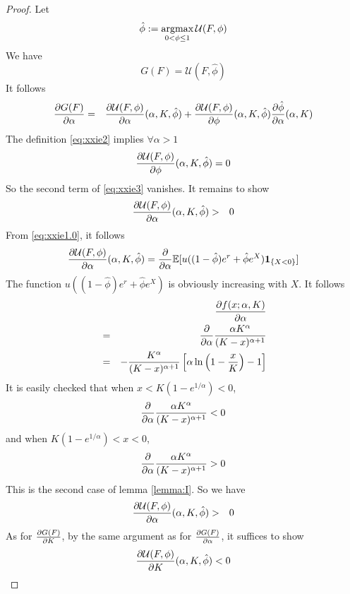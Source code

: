 \documentclass{article}
\begin{document}
\begin{proof}
  Let
  \begin{equation}
    \label{eq:xxie2}
    \hat \phi := \operatorname*{argmax}_{0 < \phi \leq 1} \mathcal U(F, \phi)
  \end{equation}
  We have
  \[
  G(F) = \mathcal U(F, \hat\phi)
  \]
  It follows
  \begin{eqnarray}
    \frac{\partial G(F)}{\partial \alpha}
    &=&
    \frac{\partial \mathcal U(F, \phi)}{\partial \alpha}(\alpha, K, \hat\phi)
    + \frac{\partial \mathcal U(F, \phi)}{\partial \phi}(\alpha, K, \hat\phi)
    \frac{\partial \hat\phi}{\partial \alpha}(\alpha, K)
    \label{eq:xxie3}
  \end{eqnarray}
  The definition \eqref{eq:xxie2} implies $\forall \alpha > 1$
  \begin{equation}
    \label{eq:xxie4}
    \frac{\partial \mathcal U(F, \phi)}{\partial \phi}(\alpha, K, \hat \phi) = 0
  \end{equation}
  So the second term of \eqref{eq:xxie3} vanishes. It remains to show
  \begin{eqnarray*}
    \frac{\partial \mathcal U(F, \phi)}{\partial \alpha}(\alpha, K, \hat \phi)
    &>& 0
  \end{eqnarray*}
  From \eqref{eq:xxie1.0}, it follows
  \begin{eqnarray*}
    \frac{\partial \mathcal U(F, \phi)}{\partial \alpha}(\alpha, K, \hat\phi)
    = \frac{\partial}{\partial \alpha}\mathbb{E}[u((1 - \hat\phi) e^r + \hat\phi e^X) \mathbf{1}_{\{X < 0\}}]
  \end{eqnarray*}
  The function $u((1 - \hat\phi) e^r + \hat\phi e^X)$ is obviously increasing
  with $X$. It follows
  \begin{eqnarray*}
    && \frac{\partial f(x; \alpha, K)}{\partial \alpha} \\
    &=& \frac{\partial}{\partial \alpha} {\alpha K^\alpha \over (K - x)^{\alpha + 1}} \\
    &=&
    - {K^\alpha \over (K - x)^{\alpha + 1}}
    \left[
      \alpha
      \ln\left(
        1 - {x \over K}
      \right) - 1
    \right]
  \end{eqnarray*}
  It is easily checked that when $x < K(1 - e^{1/\alpha}) < 0$,
  \[
  \frac{\partial}{\partial \alpha} {\alpha K^\alpha \over (K - x)^{\alpha + 1}} < 0
  \]
  and when $K(1 - e^{1/\alpha}) < x < 0$,
  \[
  \frac{\partial}{\partial \alpha} {\alpha K^\alpha \over (K - x)^{\alpha + 1}} > 0
  \]
  This is the second case of lemma \ref{lemma:I}. So we have
  \begin{eqnarray*}
    \frac{\partial \mathcal U(F, \phi)}{\partial \alpha}(\alpha, K, \hat\phi) &>& 0
  \end{eqnarray*}
  As for $\frac{\partial G(F)}{\partial K}$, by the same argument as for
  $\frac{\partial G(F)}{\partial \alpha}$, it suffices to show
  \[
  \frac{\partial \mathcal U(F, \phi)}{\partial K}(\alpha, K, \hat\phi) < 0
\]
\end{proof}
\end{document}
